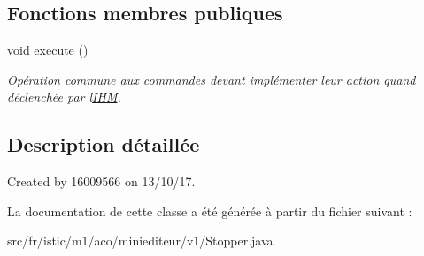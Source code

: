 \subsection*{Fonctions membres publiques}
\begin{DoxyCompactItemize}
\item 
\mbox{\label{classfr_1_1istic_1_1m1_1_1aco_1_1miniediteur_1_1v1_1_1Stopper_a39d1f6428e1fb70e179c45537e41a20e}} 
void \hyperlink{classfr_1_1istic_1_1m1_1_1aco_1_1miniediteur_1_1v1_1_1Stopper_a39d1f6428e1fb70e179c45537e41a20e}{execute} ()
\begin{DoxyCompactList}\small\item\em Opération commune aux commandes devant implémenter leur action quand déclenchée par l\textquotesingle{}\hyperlink{interfacefr_1_1istic_1_1m1_1_1aco_1_1miniediteur_1_1v1_1_1IHM}{I\+HM}. \end{DoxyCompactList}\end{DoxyCompactItemize}


\subsection{Description détaillée}
Created by 16009566 on 13/10/17. 

La documentation de cette classe a été générée à partir du fichier suivant \+:\begin{DoxyCompactItemize}
\item 
src/fr/istic/m1/aco/miniediteur/v1/Stopper.\+java\end{DoxyCompactItemize}
